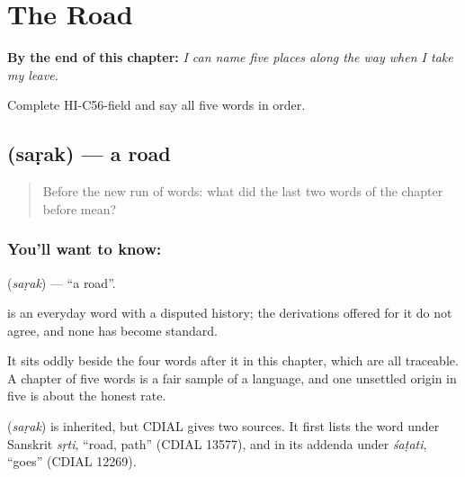 
\chapter{The Road}
\label{ch:hi-the-road}

\begin{chapteropening}
\textbf{By the end of this chapter:} \emph{I can name five places along the way when I take my leave.}

Complete HI-C56-field and say all five words in order.
\end{chapteropening}

\section[\texorpdfstring{\hi{सड़क} (saṛak)}{सड़क (saṛak)}]{ (saṛak) — a road}

\label{lesson:HI-C56-road}



\begin{quote}
Before the new run of words: what did the last two words of the chapter before mean?
\end{quote}

\subsection*{You'll want to know: }
\textbf{} (\emph{saṛak}) — \textquotedblleft{}a road\textquotedblright{}.

 is an everyday word with a disputed history; the derivations offered for it do not agree, and none has become standard.

It sits oddly beside the four words after it in this chapter, which are all traceable. A chapter of five words is a fair sample of a language, and one unsettled origin in five is about the honest rate.

\begin{cousinweb}
\textbf{} (\emph{saṛak}) is inherited, but CDIAL gives two sources. It first lists the word under Sanskrit \emph{sṛti}, \textquotedblleft{}road, path\textquotedblright{} (CDIAL 13577), and in its addenda under \emph{śaṭati}, \textquotedblleft{}goes\textquotedblright{} (CDIAL 12269).
\end{cousinweb}

